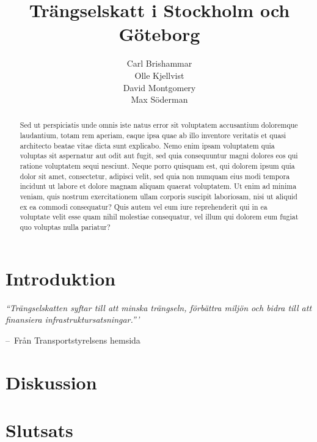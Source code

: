 \documentclass{amsart}
\title{Trängselskatt i Stockholm och Göteborg}
\author{Carl Brishammar \\ Olle Kjellvist \\ David Montgomery \\ Max Söderman}
\date{}
\makeatletter
\newenvironment{chapquote}[2][2em]
  {\setlength{\@tempdima}{#1}%
   \def\chapquote@author{#2}%
   \parshape 1 \@tempdima \dimexpr\textwidth-2\@tempdima\relax%
   \itshape}
  {\par\normalfont\hfill--\ \chapquote@author\hspace*{\@tempdima}\par\bigskip}
\makeatother
\begin{document}
\maketitle
\begin{abstract}
	Sed ut perspiciatis unde omnis iste natus error sit voluptatem accusantium doloremque laudantium, totam rem aperiam, eaque ipsa quae ab illo inventore veritatis et quasi architecto beatae vitae dicta sunt explicabo. Nemo enim ipsam voluptatem quia voluptas sit aspernatur aut odit aut fugit, sed quia consequuntur magni dolores eos qui ratione voluptatem sequi nesciunt. Neque porro quisquam est, qui dolorem ipsum quia dolor sit amet, consectetur, adipisci velit, sed quia non numquam eius modi tempora incidunt ut labore et dolore magnam aliquam quaerat voluptatem. Ut enim ad minima veniam, quis nostrum exercitationem ullam corporis suscipit laboriosam, nisi ut aliquid ex ea commodi consequatur? Quis autem vel eum iure reprehenderit qui in ea voluptate velit esse quam nihil molestiae consequatur, vel illum qui dolorem eum fugiat quo voluptas nulla pariatur?
\end{abstract}
\newpage
\tableofcontents
\newpage
\section{Introduktion}

\begin{chapquote}{Från Transportstyrelsens hemsida}
``Trängselskatten syftar till att minska trängseln, förbättra miljön och bidra till att finansiera infrastruktursatsningar.”'
\end{chapquote}





\section{Diskussion}

\section{Slutsats}

\newpage
\printbibliography
\end{document}
